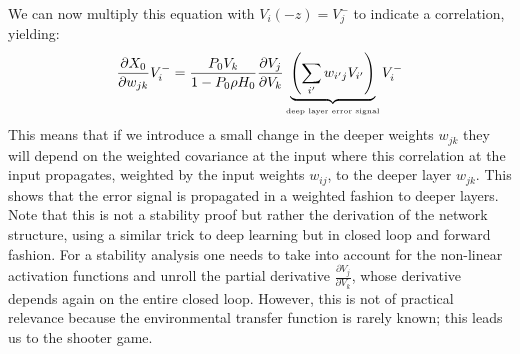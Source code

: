 \documentclass[Afour,sageh,times]{sagej}
\begin{document}
  We can now multiply this equation with $V_i(-z)=V_j^-$ to indicate a correlation, yielding:
\begin{equation}
    \frac{\partial X_0}{\partial w_{jk}} V_i^- =   
    \frac{P_0 V_k}{1-P_0 \rho H_0}
    \frac{\partial V_j}{\partial V_k}
    \underbrace{\left( \sum_{i^\prime} w_{i^\prime j} V_{i^\prime} \right)}_\textrm{\tiny deep layer error signal} V_i^-
\end{equation}
This means that if we introduce a small change in the deeper weights
$w_{jk}$ they will depend on the weighted covariance at the input
where this correlation at the input propagates, weighted by the input
weights $w_{ij}$, to the deeper layer $w_{jk}$. This shows that the
error signal is propagated in a weighted fashion to deeper
layers. Note that this is not a stability proof but rather the
derivation of the network structure, using a similar trick to deep
learning but in closed loop and forward fashion. For a stability
analysis one needs to take into account for the non-linear activation
functions and unroll the partial derivative $\frac{\partial
  V_j}{\partial V_k}$, whose derivative depends again on the entire
closed loop. However, this is not of practical relevance because the
environmental transfer function is rarely known; this leads us to
the shooter game.
\end{document}
